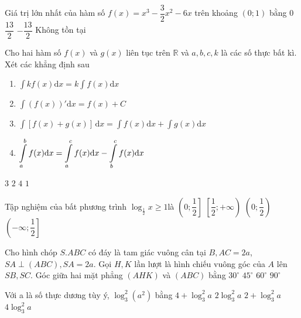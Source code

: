\begin{ex}%
Giá trị lớn nhất của hàm số $f(x)=x^3-\dfrac{3}{2} x^2-6 x$ trên khoảng $(0; 1)$ bằng
\choice
{$0$}
{$\dfrac{13}{2}$}
{$-\dfrac{13}{2}$}
{\True Không tồn tại}

\end{ex}
\begin{ex}%
Cho hai hàm số $f(x)$ và $g(x)$ liên tục trên $\mathbb{R}$ và $a, b, c, k$ là các số thực bất kì. Xét các khẳng định sau
\begin{enumerate}
	

\item $\displaystyle\int k f(x) \mathrm{d} x=k \displaystyle\int f(x) \mathrm{d} x$\\
\item  $ \displaystyle\int(f(x))'\mathrm{d} x=f(x)+C $\\
\item  $ \displaystyle\int[f(x)+g(x)]\mathrm{\,d}x=\displaystyle\int f(x) \mathrm{d} x+ \displaystyle\int g(x) \mathrm{d} x$\\
\item $ \displaystyle\int\limits_a^{b} f(x) \mathrm{d} x=\displaystyle\int\limits_a^{c} f(x) \mathrm{d} x-\displaystyle\int\limits_b^{c} f(x){\rm d}x $
\end{enumerate}
\choice
{$3$}
{\True $2$}
{$4$}
{$1$}

\end{ex}
\begin{ex}%
Tập nghiệm của bất phương trình $ \log_{\frac{1}{2}} x \geq 1 $là
\choice
{\True $ \left(0; \dfrac{1}{2}\right] $}
{$ \left[\dfrac{1}{2};+\infty\right) $}
{$ \left(0; \dfrac{1}{2}\right) $}
{$ \left(-\infty; \dfrac{1}{2}\right] $}

\end{ex}
\begin{ex}%
Cho hình chóp $ S.ABC $ có đáy là tam giác vuông cân tại $ B, AC=2a $, $SA \perp(ABC), SA=2 a $. Gọi $ H, K $ lần lượt là hình chiếu vuông góc của $ A $ lên $ SB, SC $. Góc giữa hai mặt phẳng $ (AHK) $ và $ (ABC) $ bằng
\choice
{$ 30^{\circ} $}
{\True $ 45^{\circ} $}
{$ 60^{\circ} $}
{$ 90^{\circ} $}

\end{ex}
\begin{ex}%
Với a là số thực dương tùy ý, $ \log_3^2\left(a^2\right) $ bằng
\choice
{$ 4+\log_3^2 a $}
{$ 2\log_3^2 a $}
{$ 2+\log_3^2 a $}
{\True $ 4\log_3^2 a $}

\end{ex}
